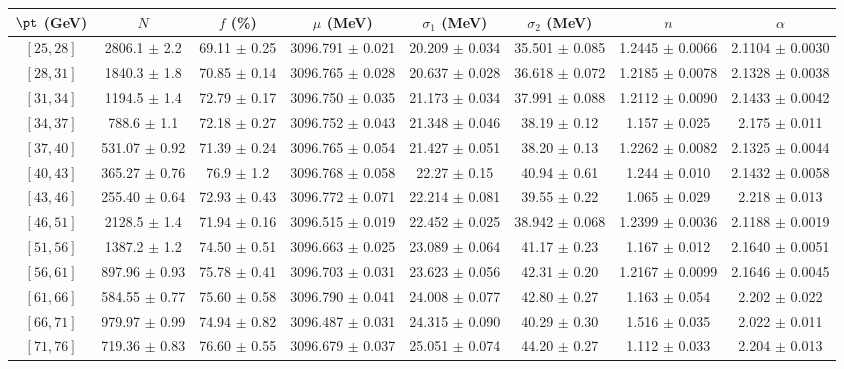 \begin{tabular}{c||c|c|c|c|c|c|c}
$\pt$ (GeV) & $N$ & $f$ (\%) & $\mu$ (MeV) & $\sigma_1$ (MeV) & $\sigma_2$ (MeV) & $n$ & $\alpha$ \\
\hline
$[25, 28]$ & 2806.1 $\pm$ 2.2 & 69.11 $\pm$ 0.25 & 3096.791 $\pm$ 0.021 & 20.209 $\pm$ 0.034 & 35.501 $\pm$ 0.085 & 1.2445 $\pm$ 0.0066 & 2.1104 $\pm$ 0.0030\\
$[28, 31]$ & 1840.3 $\pm$ 1.8 & 70.85 $\pm$ 0.14 & 3096.765 $\pm$ 0.028 & 20.637 $\pm$ 0.028 & 36.618 $\pm$ 0.072 & 1.2185 $\pm$ 0.0078 & 2.1328 $\pm$ 0.0038\\
$[31, 34]$ & 1194.5 $\pm$ 1.4 & 72.79 $\pm$ 0.17 & 3096.750 $\pm$ 0.035 & 21.173 $\pm$ 0.034 & 37.991 $\pm$ 0.088 & 1.2112 $\pm$ 0.0090 & 2.1433 $\pm$ 0.0042\\
$[34, 37]$ & 788.6 $\pm$ 1.1 & 72.18 $\pm$ 0.27 & 3096.752 $\pm$ 0.043 & 21.348 $\pm$ 0.046 & 38.19 $\pm$ 0.12 & 1.157 $\pm$ 0.025 & 2.175 $\pm$ 0.011\\
$[37, 40]$ & 531.07 $\pm$ 0.92 & 71.39 $\pm$ 0.24 & 3096.765 $\pm$ 0.054 & 21.427 $\pm$ 0.051 & 38.20 $\pm$ 0.13 & 1.2262 $\pm$ 0.0082 & 2.1325 $\pm$ 0.0044\\
$[40, 43]$ & 365.27 $\pm$ 0.76 & 76.9 $\pm$ 1.2 & 3096.768 $\pm$ 0.058 & 22.27 $\pm$ 0.15 & 40.94 $\pm$ 0.61 & 1.244 $\pm$ 0.010 & 2.1432 $\pm$ 0.0058\\
$[43, 46]$ & 255.40 $\pm$ 0.64 & 72.93 $\pm$ 0.43 & 3096.772 $\pm$ 0.071 & 22.214 $\pm$ 0.081 & 39.55 $\pm$ 0.22 & 1.065 $\pm$ 0.029 & 2.218 $\pm$ 0.013\\
$[46, 51]$ & 2128.5 $\pm$ 1.4 & 71.94 $\pm$ 0.16 & 3096.515 $\pm$ 0.019 & 22.452 $\pm$ 0.025 & 38.942 $\pm$ 0.068 & 1.2399 $\pm$ 0.0036 & 2.1188 $\pm$ 0.0019\\
$[51, 56]$ & 1387.2 $\pm$ 1.2 & 74.50 $\pm$ 0.51 & 3096.663 $\pm$ 0.025 & 23.089 $\pm$ 0.064 & 41.17 $\pm$ 0.23 & 1.167 $\pm$ 0.012 & 2.1640 $\pm$ 0.0051\\
$[56, 61]$ & 897.96 $\pm$ 0.93 & 75.78 $\pm$ 0.41 & 3096.703 $\pm$ 0.031 & 23.623 $\pm$ 0.056 & 42.31 $\pm$ 0.20 & 1.2167 $\pm$ 0.0099 & 2.1646 $\pm$ 0.0045\\
$[61, 66]$ & 584.55 $\pm$ 0.77 & 75.60 $\pm$ 0.58 & 3096.790 $\pm$ 0.041 & 24.008 $\pm$ 0.077 & 42.80 $\pm$ 0.27 & 1.163 $\pm$ 0.054 & 2.202 $\pm$ 0.022\\
$[66, 71]$ & 979.97 $\pm$ 0.99 & 74.94 $\pm$ 0.82 & 3096.487 $\pm$ 0.031 & 24.315 $\pm$ 0.090 & 40.29 $\pm$ 0.30 & 1.516 $\pm$ 0.035 & 2.022 $\pm$ 0.011\\
$[71, 76]$ & 719.36 $\pm$ 0.83 & 76.60 $\pm$ 0.55 & 3096.679 $\pm$ 0.037 & 25.051 $\pm$ 0.074 & 44.20 $\pm$ 0.27 & 1.112 $\pm$ 0.033 & 2.204 $\pm$ 0.013\\

\end{tabular}
